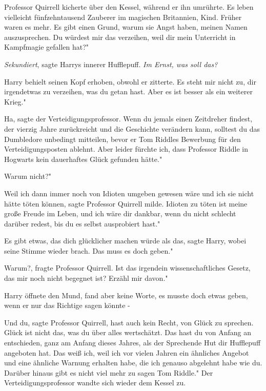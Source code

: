 Professor Quirrell kicherte über den Kessel, während er ihn umrührte. \glqq{}Es
leben vielleicht fünfzehntausend Zauberer im magischen Britannien, Kind. Früher
waren es mehr. Es gibt einen Grund, warum sie Angst haben, meinen Namen
auszusprechen. Du würdest mir das verzeihen, weil dir mein Unterricht in
Kampfmagie gefallen hat?"

\emph{Sekundiert}, sagte Harrys innerer Hufflepuff. \emph{Im Ernst, was soll
das?}

Harry behielt seinen Kopf erhoben, obwohl er zitterte. \glqq{}Es steht mir nicht
zu, dir irgendetwas zu verzeihen, was du getan hast. Aber es ist besser als ein
weiterer Krieg."

\glqq{}Ha\grqq{}, sagte der Verteidigungsprofessor. \glqq{}Wenn du jemals einen
Zeitdreher findest, der vierzig Jahre zurückreicht und die Geschichte verändern
kann, solltest du das Dumbledore unbedingt mitteilen, bevor er Tom Riddles
Bewerbung für den Verteidigungsposten ablehnt. Aber leider fürchte ich, dass
Professor Riddle in Hogwarts kein dauerhaftes Glück gefunden hätte."

\glqq{}Warum nicht?"

\glqq{}Weil ich dann immer noch von Idioten umgeben gewesen wäre und ich sie
nicht hätte töten können\grqq{}, sagte Professor Quirrell milde. \glqq{}Idioten
zu töten ist meine große Freude im Leben, und ich wäre dir dankbar, wenn du
nicht schlecht darüber redest, bis du es selbst ausprobiert hast."

\glqq{}Es gibt etwas, das dich glücklicher machen würde als das\grqq{}, sagte
Harry, wobei seine Stimme wieder brach. \glqq{}Das muss es doch geben."

\glqq{}Warum?\grqq{}, fragte Professor Quirrell. \glqq{}Ist das irgendein
wissenschaftliches Gesetz, das mir noch nicht begegnet ist? Erzähl mir davon."

Harry öffnete den Mund, fand aber keine Worte, es musste doch etwas geben, wenn
er nur das Richtige sagen könnte -

\glqq{}Und du\grqq{}, sagte Professor Quirrell, \glqq{}hast auch kein Recht, von
Glück zu sprechen. Glück ist nicht das, was du über alles wertschätzt. Das hast
du von Anfang an entschieden, ganz am Anfang dieses Jahres, als der Sprechende
Hut dir Hufflepuff angeboten hat. Das weiß ich, weil ich vor vielen Jahren ein
ähnliches Angebot und eine ähnliche Warnung erhalten habe, die ich genauso
abgelehnt habe wie du. Darüber hinaus gibt es nicht viel mehr zu sagen Tom
Riddle." Der Verteidigungsprofessor wandte sich wieder dem Kessel zu.

